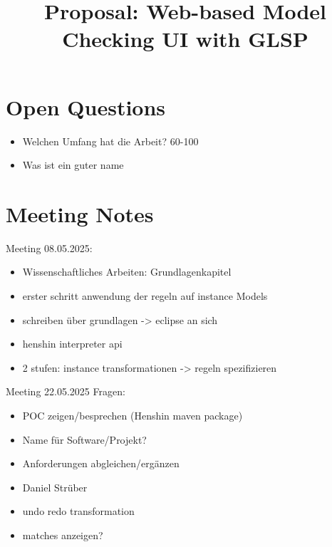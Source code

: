 \documentclass[conference,onecolumn]{IEEEtran}
\begin{document}
  \title{Proposal: Web-based Model Checking UI with GLSP}

  \author{
    }

  \maketitle

  \IEEEpeerreviewmaketitle

  \section{Open Questions}

  \begin{itemize}
    \item Welchen Umfang hat die Arbeit? 60-100
    \item Was ist ein guter name
  \end{itemize}

  \section{Meeting Notes}

  Meeting 08.05.2025:
  \begin{itemize}
    \item Wissenschaftliches Arbeiten: Grundlagenkapitel
    \item erster schritt anwendung der regeln auf instance Models
    \item schreiben über grundlagen -> eclipse an sich
    \item henshin interpreter api
    \item 2 stufen: instance transformationen -> regeln spezifizieren
  \end{itemize}

  Meeting 22.05.2025 Fragen:
  \begin{itemize}
    \item POC zeigen/besprechen (Henshin maven package)
    \item Name für Software/Projekt?
    \item Anforderungen abgleichen/ergänzen
    \item Daniel Strüber
    \item undo redo transformation
    \item matches anzeigen?
  \end{itemize}
\end{document}
